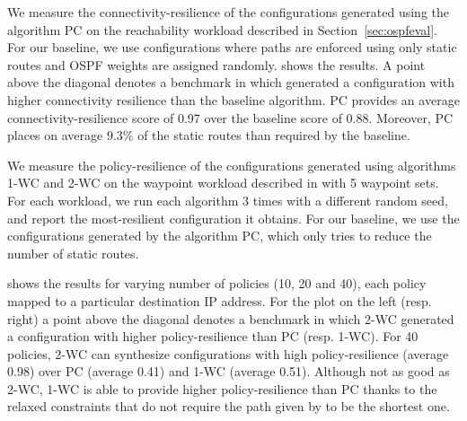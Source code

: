 
We measure the connectivity-resilience of the configurations 
generated using the algorithm PC on the reachability 
workload described in
Section~\ref{sec:ospfeval}. 
For our baseline, we use configurations 
where paths 
are enforced using only static routes and
OSPF weights are assigned randomly.
shows the results. 
A point above the diagonal 
denotes a benchmark in which \name
generated a configuration with higher connectivity resilience than
the baseline algorithm.
PC provides an average connectivity-resilience score 
of 0.97 over the baseline score 
of 0.88.
Moreover, PC places on average 
$9.3$\% of the static routes 
than required by the baseline. 

We measure the policy-resilience of the configurations 
generated using algorithms  1-WC and 2-WC on the waypoint workload described in
 with 5 waypoint sets. 
For each workload, we run each algorithm 
3 times with a different random seed, and report the most-resilient configuration it obtains.
For our baseline, we use the configurations generated by the algorithm PC, which
only tries to reduce the number of static routes.

shows the results
for varying number of policies (10, 20 and 40), each policy mapped 
to a particular destination IP address. 
For the plot on the left (resp. right)
a point above the diagonal 
denotes a benchmark in which 2-WC
generated a configuration with higher policy-resilience than
PC (resp. 1-WC).
For 40 policies, 
2-WC can synthesize 
configurations with high policy-resilience
(average 0.98) over PC (average 0.41) and 1-WC (average 0.51). 
Although not as good as 2-WC, 1-WC is able to provide 
higher policy-resilience than
PC thanks to the relaxed constraints that do not require
the path given by \genesis to be the shortest one.


